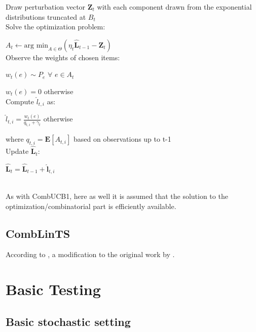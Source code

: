 Draw perturbation vector $\mathbf{Z}_t$ with each component drawn from the exponential distributions truncated at $B_t$\\

Solve the optimization problem:

\indent \indent $A_t \leftarrow \textrm{arg min}_{A\in \Theta}(\eta_t\mathbf{\hat{L}}_{t-1}-\mathbf{Z}_t)$\\

Observe the weights of chosen items:

\indent \indent $w_t(e) \sim P_e$ $\forall$ $e \in A_t$

\indent \indent $w_t(e)=0$ otherwise\\

Compute $\hat{l}_{t,i}$ as:

\indent \indent $\hat{l}_{t,i}=\frac{w_t(e)}{q_{t,i}+\gamma_t}$ otherwise

\indent \indent where $q_{t,i}=\textbf{E}[A_{t,i}]$ based on observations up to t-1\\

Update $\mathbf{\hat{L}}_t$:

\indent \indent $\mathbf{\hat{L}}_t=\mathbf{\hat{L}}_{t-1}+\mathbf{\hat{l}}_{t,i}$

\noindent \hrulefill\\

As with CombUCB1, here as well it is assumed that the solution to the optimization/combinatorial part is efficiently available.

\subsection{CombLinTS}

According to \cite{wen2015efficient}, a modification to the original work by \cite{thompson1933}.


\pagebreak


\section{Basic Testing}

\subsection{Basic stochastic setting}

